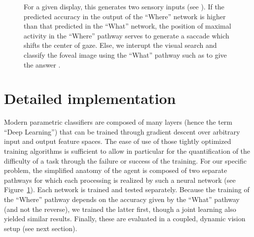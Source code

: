 \begin{figure}[t!]
{		\D
		For a given display, this generates two sensory inputs (see \B ).
		If the predicted accuracy in the output of the ``Where'' network is higher than that predicted in the ``What'' network, the position of maximal activity in the ``Where'' pathway serves to generate a saccade which shifts the center of gaze. Else, we interupt the visual search and classify the foveal image using the ``What'' pathway such as to give the answer \ANS . %
		\label{fig:methods}}%
\end{figure}%

\section*{Detailed implementation}
\label{sec:implementation}

Modern parametric classifiers are composed of many layers (hence the term ``Deep Learning'') that can be trained through gradient descent over arbitrary input and output feature spaces. The ease of use of those tightly optimized training algorithms is sufficient to allow in particular for the quantification of the difficulty of a task through the failure or success of the training.
For our specific problem, the simplified anatomy of the agent is composed of two separate pathways for which each processing is realized by such a neural network (see Figure~\ref{fig:methods}). Each network is trained and tested separately. Because the training of the ``Where'' pathway depends on the accuracy given by the ``What'' pathway (and not the reverse), we trained the latter first, though a joint learning also yielded similar results. %
Finally, these are evaluated in a coupled, dynamic vision setup (see next section).

